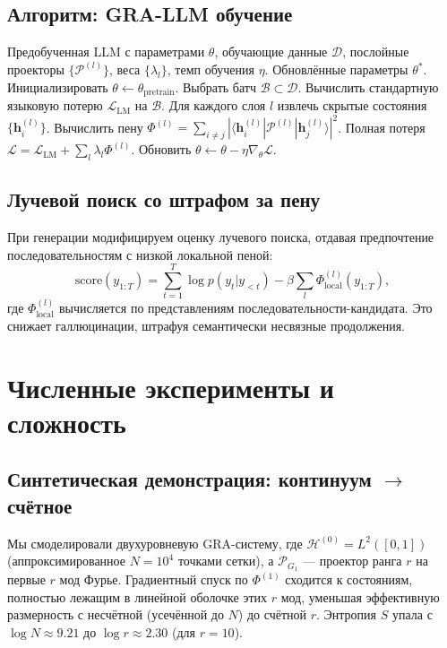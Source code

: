 \documentclass[11pt]{article}
\newcommand{\cP}{\mathcal{P}}
\newcommand{\cH}{\mathcal{H}}
\begin{document}
\subsection{Алгоритм: GRA-LLM обучение}
\begin{algorithm}[H]
\caption{GRA-регуляризованное дообучение LLM}
\label{alg:gra_llm}
\begin{algorithmic}[1]
\REQUIRE Предобученная LLM с параметрами $\theta$, обучающие данные $\mathcal{D}$, послойные проекторы $\{\cP^{(l)}\}$, веса $\{\lambda_l\}$, темп обучения $\eta$.
\ENSURE Обновлённые параметры $\theta^*$.
\STATE Инициализировать $\theta \leftarrow \theta_{\text{pretrain}}$.
    \STATE Выбрать батч $\mathcal{B} \subset \mathcal{D}$.
    \STATE Вычислить стандартную языковую потерю $\mathcal{L}_{\text{LM}}$ на $\mathcal{B}$.
    \STATE Для каждого слоя $l$ извлечь скрытые состояния $\{\mathbf{h}_i^{(l)}\}$.
    \STATE Вычислить пену $\Phi^{(l)} = \sum_{i \neq j} |\langle \mathbf{h}_i^{(l)} | \cP^{(l)} | \mathbf{h}_j^{(l)}\rangle|^2$.
    \STATE Полная потеря $\mathcal{L} = \mathcal{L}_{\text{LM}} + \sum_l \lambda_l \Phi^{(l)}$.
    \STATE Обновить $\theta \leftarrow \theta - \eta \nabla_\theta \mathcal{L}$.
\ENDWHILE
\end{algorithmic}
\end{algorithm}

\subsection{Лучевой поиск со штрафом за пену}
При генерации модифицируем оценку лучевого поиска, отдавая предпочтение последовательностям с низкой локальной пеной:
\[
\text{score}(y_{1:T}) = \sum_{t=1}^T \log p(y_t | y_{<t}) - \beta \sum_{l} \Phi^{(l)}_{\text{local}}(y_{1:T}),
\]
где $\Phi^{(l)}_{\text{local}}$ вычисляется по представлениям последовательности-кандидата. Это снижает галлюцинации, штрафуя семантически несвязные продолжения.

\section{Численные эксперименты и сложность}
\label{sec:experiments}

\subsection{Синтетическая демонстрация: континуум $\to$ счётное}
Мы смоделировали двухуровневую GRA-систему, где $\cH^{(0)} = L^2([0,1])$ (аппроксимированное $N=10^4$ точками сетки), а $\cP_{G_1}$ --- проектор ранга $r$ на первые $r$ мод Фурье. Градиентный спуск по $\Phi^{(1)}$ сходится к состояниям, полностью лежащим в линейной оболочке этих $r$ мод, уменьшая эффективную размерность с несчётной (усечённой до $N$) до счётной $r$. Энтропия $S$ упала с $\log N \approx 9.21$ до $\log r \approx 2.30$ (для $r=10$).
\end{document}
